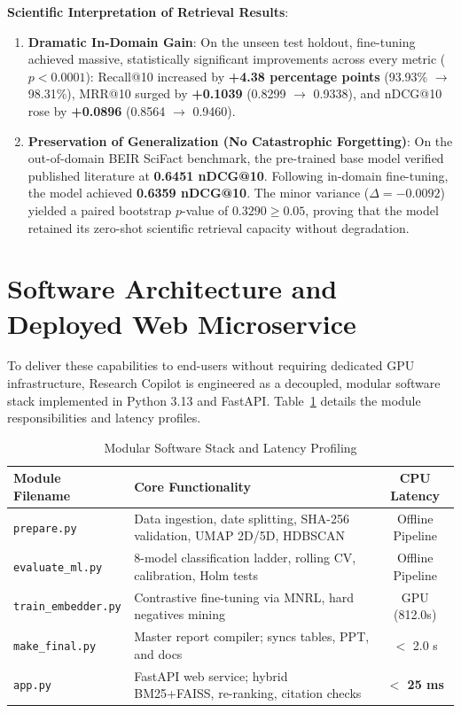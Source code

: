 \documentclass[journal]{IEEEtran}
\begin{document}
\textbf{Scientific Interpretation of Retrieval Results}:
\begin{enumerate}
    \item \textbf{Dramatic In-Domain Gain}: On the unseen test holdout, fine-tuning achieved massive, statistically significant improvements across every metric ($p < 0.0001$): Recall@10 increased by \textbf{+4.38 percentage points} (93.93\% $\rightarrow$ 98.31\%), MRR@10 surged by \textbf{+0.1039} (0.8299 $\rightarrow$ 0.9338), and nDCG@10 rose by \textbf{+0.0896} (0.8564 $\rightarrow$ 0.9460).
    \item \textbf{Preservation of Generalization (No Catastrophic Forgetting)}: On the out-of-domain BEIR SciFact benchmark, the pre-trained base model verified published literature at \textbf{0.6451 nDCG@10}. Following in-domain fine-tuning, the model achieved \textbf{0.6359 nDCG@10}. The minor variance ($\Delta = -0.0092$) yielded a paired bootstrap $p$-value of \textbf{$0.3290 \ge 0.05$}, proving that the model retained its zero-shot scientific retrieval capacity without degradation.
\end{enumerate}

\section{Software Architecture and Deployed Web Microservice}
To deliver these capabilities to end-users without requiring dedicated GPU infrastructure, Research Copilot is engineered as a decoupled, modular software stack implemented in Python 3.13 and FastAPI. Table~\ref{tab:software} details the module responsibilities and latency profiles.

\begin{table}[t]
\caption{Modular Software Stack and Latency Profiling}
\label{tab:software}
\centering
\small
\begin{tabular}{lp{3.6cm}c}
\toprule
\textbf{Module Filename} & \textbf{Core Functionality} & \textbf{CPU Latency} \\
\midrule
\texttt{prepare.py} & Data ingestion, date splitting, SHA-256 validation, UMAP 2D/5D, HDBSCAN & Offline Pipeline \\
\texttt{evaluate\_ml.py} & 8-model classification ladder, rolling CV, calibration, Holm tests & Offline Pipeline \\
\texttt{train\_embedder.py} & Contrastive fine-tuning via MNRL, hard negatives mining & GPU (812.0s) \\
\texttt{make\_final.py} & Master report compiler; syncs tables, PPT, and docs & $<$ 2.0 s \\
\texttt{app.py} & FastAPI web service; hybrid BM25+FAISS, re-ranking, citation checks & \textbf{$<$ 25 ms} \\
\bottomrule
\end{tabular}
\end{table}
\end{document}
